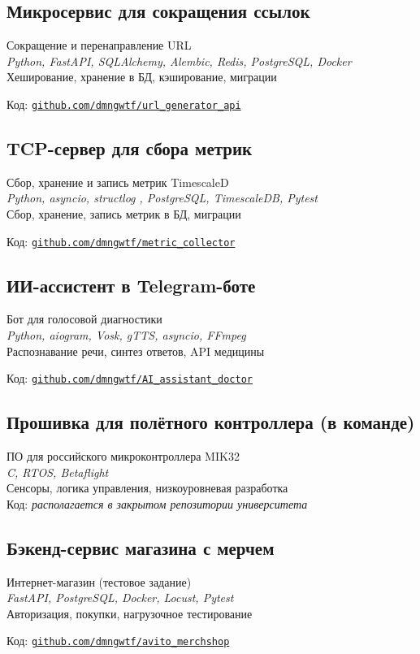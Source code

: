 \documentclass[a4paper,12pt]{article}
\begin{document}
	\subsection*{Микросервис для сокращения ссылок}
	Сокращение и перенаправление URL  \\
	\textit{Python, FastAPI, SQLAlchemy, Alembic, Redis, PostgreSQL, Docker} \\ 
	Хеширование, хранение в БД, кэширование, миграции\\
	{Код: \href{https://github.com/dmngwtf/url_generator_api}{\texttt{github.com/dmngwtf/url\_generator\_api}}
	
	
	\subsection*{TCP-сервер для сбора метрик}
	Сбор, хранение и запись метрик  TimescaleD \\
	\textit{Python, asyncio, structlog , PostgreSQL, TimescaleDB, Pytest} \\ 
	Сбор, хранение, запись метрик в БД, миграции\\
	{Код: \href{https://github.com/dmngwtf/metric_collector}{\texttt{github.com/dmngwtf/metric\_collector}}
		
	
	
	\subsection*{ИИ-ассистент в Telegram-боте}
	Бот для голосовой диагностики  \\
	\textit{Python, aiogram, Vosk, gTTS, asyncio, FFmpeg} \\ 
	Распознавание речи, синтез ответов, API медицины\\
	{Код: \href{https://github.com/dmngwtf/AI_assistant_doctor}{\texttt{github.com/dmngwtf/AI\_assistant\_doctor}}
	
	
	\subsection*{Прошивка для полётного контроллера (в команде)}
	ПО для российского микроконтроллера MIK32  \\
	\textit{C, RTOS, Betaflight}  \\
	Сенсоры, логика управления, низкоуровневая разработка\\
	Код: \textit{располагается в закрытом репозитории университета}
	
	\subsection*{Бэкенд-сервис магазина с мерчем}
	Интернет-магазин (тестовое задание)  \\
	\textit{FastAPI, PostgreSQL, Docker, Locust, Pytest}  \\
	Авторизация, покупки, нагрузочное тестирование\\
	{Код: \href{https://github.com/dmngwtf/avito_merchshop}{\texttt{github.com/dmngwtf/avito\_merchshop}}
	
}}}}
\end{document}
